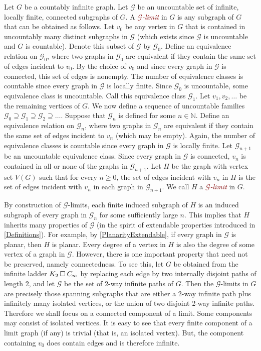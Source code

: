 \documentclass[a4paper,11pt]{article}
\makeatletter
\newcommand{\DefNoIndex}[1]{\textcolor{Maroon}{\emph{#1}}}
\newcommand{\hdefn}[2]{\textcolor{Maroon}{\emph{#1-#2}}\index{#2@#1-#2}}
\theoremstyle{plain}
\theoremstyle{definition}
\newcommand{\CartProd}{\mathbin{\square}}
\renewcommand{\ge}{\geqslant}
\newcommand{\PPP}{C_{\hspace{-0.15ex}\infty}}
\newcommand{\GG}{\mathcal{G}}
\newcommand{\NN}{\mathbb{N}}
\makeatother
\begin{document}
 Let $G$ be a countably infinite graph. Let $\GG$ be an uncountable set of infinite, locally finite, connected subgraphs of $G$. A \hdefn{$\GG$}{limit} in $G$ is any subgraph of $G$ that can be obtained as follows.  Let $v_0$ be any vertex in $G$ that is contained in uncountably many distinct subgraphs in $\GG$ (which exists since $\GG$ is uncountable and $G$ is countable). Denote this subset of $\GG$ by $\GG_0$. Define an equivalence relation on $\GG_0$, where two graphs in $\GG_0$ are equivalent if they contain the same set of edges incident to $v_0$. By the choice of $v_0$ and since every graph in $\GG$ is connected, this set of edges is nonempty. The number of equivalence classes is countable since every graph in $\GG$ is locally finite. Since $\GG_0$ is uncountable, some equivalence class is uncountable. Call this equivalence class $\GG_1$. Let $v_1,v_2, \ldots$ be the remaining vertices of $G$. We now define a sequence of uncountable families $\GG_0\supseteq \GG_1\supseteq \GG_2\supseteq\dots$. Suppose that $\GG_n$ is defined for some $n\in\NN$. Define an equivalence relation on $\GG_n$, where two graphs in $\GG_n$ are equivalent if they contain the same set of edges incident to $v_n$ (which may be empty). Again, the number of equivalence classes is countable since every graph in $\GG$ is locally finite. Let $\GG_{n+1}$ be an uncountable equivalence class. Since every graph in $\GG$ is connected, $v_n$ is contained in all or none of the graphs in $\GG_{n+1}$. Let $H$ be the graph with vertex set $V(G)$ such that for every $n\ge0$, the set of edges incident with $v_n$ in $H$ is the set of edges incident with $v_n$ in each graph in $\GG_{n+1}$. We call $H$ a \DefNoIndex{$\GG$-limit} in $G$. 

By construction of $\GG$-limits, each finite induced subgraph of $H$ is an induced subgraph of every graph in $\GG_n$ for some sufficiently large $n$. This implies that $H$ inherits many properties of $\GG$ (in the spirit of extendable properties introduced in \cref{Definitions}). For example, by \cref{PlanarityExtendable}, if every graph in $\GG$ is planar, then $H$ is planar. Every degree of a vertex in $H$ is also the degree of some vertex of a graph in $\GG$. However, there is one important property that need not be preserved, namely connectedness. To see this, let $G$ be obtained from the infinite ladder $K_2\CartProd \PPP$ by replacing each edge by two internally disjoint paths of length 2, and let $\GG$ be the set of 2-way infinite paths of $G$. Then the $\GG$-limits in $G$ are precisely those spanning subgraphs that are either a 2-way infinite path plus infinitely many isolated vertices, or the union of two disjoint 2-way infinite paths. Therefore we shall focus on a connected component of a limit. Some components may consist of isolated vertices. It is easy to see that every ﬁnite component of a limit graph (if any) is trivial (that is, an isolated vertex). But, the component containing $v_0$ does contain edges and is therefore infinite. 
\end{document}
